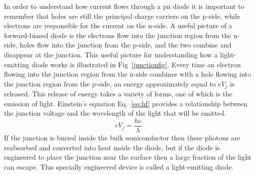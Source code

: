 \documentclass{revtex4}
\begin{document}
In order to understand how current flows through a pn diode it
is important to remember that holes are still the principal charge carriers
on the p-side, while electrons are responsible for the current on the n-side.
A useful picture of a forward-biased diode is the electrons flow into the
junction region from the n-side, holes flow into the junction from the p-side,
and the two combine and disappear at the junction.  This useful picture for
understanding how a light-emitting diode works is illustrated in
Fig~\ref{junctionfig}.  Every time an electron
flowing into the junction region from the n-side combines with a hole flowing
into the junction region from the p-side, an energy approximately equal to
$eV_j$ is released.  This release of energy takes a variety of forms, one
of which is the emission of light.  Einstein's equation Eq.~\ref{eq:hf}
provides a relationship between the junction voltage and the wavelength of
the light that will be emitted.
\begin{equation}
eV_j = \frac{hc}{\lambda}
\label{eq:Vjlambda}
\end{equation}
If the junction is buried inside the bulk semiconductor then these photons
are reabsorbed and converted into heat inside the diode, but if the diode is
engineered to place the junction near the surface then a large fraction of
the light can escape.  This specially engineered device is called a
light-emitting diode.
\end{document}
